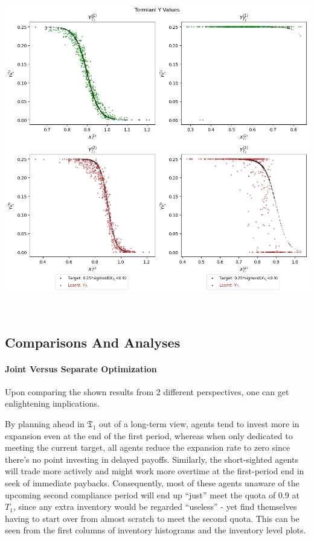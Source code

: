 \documentclass[a4paper,10pt]{article}
\newcommand{\1}{\mathbf{1}}
\begin{document}
\begin{minipage}{\textwidth}
\begin{minipage}[ht]{0.65\textwidth}
    \includegraphics[]{FinalReports/Illustration_diagrams/Seprt-2A2P-Sigmoid-ResExamples/sigmoid_target.png}\\
    \label{fig:terminal-values-sep}
  \end{minipage}\\
\end{minipage}


\newpage  %

\subsection{Comparisons And Analyses}

\paragraph{Joint Versus Separate Optimization}

Upon comparing the shown results from 2 different perspectives, one can
get enlightening implications.

By planning ahead in \(\mathfrak{T}_1\) out of a long-term view,
agents tend to invest more in expansion even at the end of the first
period, whereas when only dedicated to meeting the current target, all
agents reduce the expansion rate to zero since there's no point
investing in delayed payoffs. Similarly, the short-sighted agents will
trade more actively and might work more overtime at the first-period end
in seek of immediate paybacks. Consequently, most of these agents
unaware of the upcoming second compliance period will end up ``just''
meet the quota of 0.9 at \(T_1\), since any extra inventory would be
regarded ``useless'' - yet find themselves having to start over from
almost scratch to meet the second quota. This can be seen from
the first columns of inventory histograms and the inventory level plots.
\end{document}

